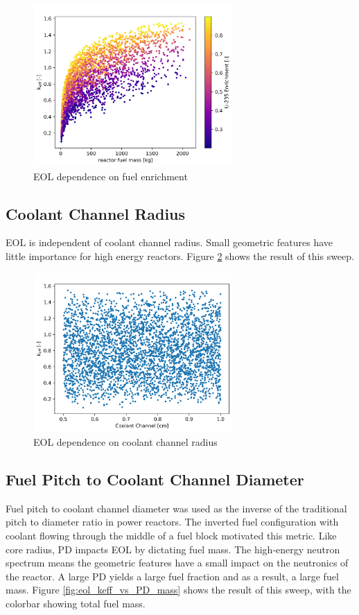 \begin{figure}[h]
    \centering
    \includegraphics[width=3in]{../images/keff_vs_mass_enrich.png}
\caption{EOL \keff dependence on fuel enrichment}
\label{fig:eol_keff_vs_mass_enrich}
\end{figure}


\subsection{Coolant Channel Radius}
EOL \keff is independent of coolant channel radius. Small geometric features
have little importance for high energy reactors. Figure
\ref{fig:eol_keff_vs_r_cool} shows the result of this sweep.

\begin{figure}[h]
    \centering
    \includegraphics[width=3in]{../images/keff_vs_cool_r.png}
\caption{EOL \keff dependence on coolant channel radius}
\label{fig:eol_keff_vs_r_cool}
\end{figure}

\subsection{Fuel Pitch to Coolant Channel Diameter}
Fuel pitch to coolant channel diameter was used as the inverse of the traditional pitch
to diameter ratio in power reactors. The inverted fuel configuration with
coolant flowing through the middle of a fuel block motivated this metric. Like
core radius, PD impacts EOL \keff by dictating fuel mass. The high-energy
neutron spectrum means the geometric features have a small impact on the
neutronics of the reactor. A large PD yields a large fuel fraction and as a
result, a large fuel mass. Figure
\ref{fig:eol_keff_vs_PD_mass} shows the result of this sweep, with the colorbar
showing total fuel mass.

